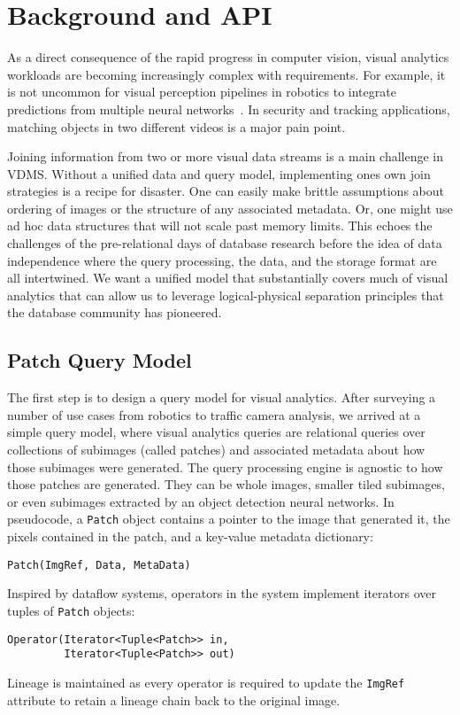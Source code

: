 \section{Background and API}
As a direct consequence of the rapid progress in computer vision, visual analytics workloads are becoming increasingly complex with requirements. 
For example, it is not uncommon for visual perception pipelines in robotics to integrate predictions from multiple neural networks~\cite{hodson2018robots}.
In security and tracking applications, matching objects in two different videos is a major pain point.

Joining information from two or more visual data streams is a main challenge in VDMS.
Without a unified data and query model, implementing ones own join strategies is a recipe for disaster.
One can easily make brittle assumptions about ordering of images or the structure of any associated metadata.
Or, one might use ad hoc data structures that will not scale past memory limits.
This echoes the challenges of the pre-relational days of database research before the idea of data independence where the query processing, the data, and the storage format are all intertwined.
We want a unified model that substantially covers much of visual analytics that can allow us to leverage logical-physical separation principles that the database community has pioneered.

\subsection{Patch Query Model}
The first step is to design a query model for visual analytics.
After surveying a number of use cases from robotics to traffic camera analysis, we arrived at a simple query model, where visual analytics queries are relational queries over collections of subimages (called patches) and associated metadata about how those subimages were generated.
The query processing engine is agnostic to how those patches are generated.
They can be whole images, smaller tiled subimages, or even subimages extracted by an object detection neural networks.
In pseudocode, a \texttt{Patch} object contains a pointer to the image that generated it, the pixels contained in the patch, and a key-value metadata dictionary:
\begin{lstlisting}
Patch(ImgRef, Data, MetaData)
\end{lstlisting}
Inspired by dataflow systems, operators in the system implement iterators over tuples of \texttt{Patch} objects:
\begin{lstlisting}
Operator(Iterator<Tuple<Patch>> in, 
         Iterator<Tuple<Patch>> out)
\end{lstlisting}
Lineage is maintained as every operator is required to update the \texttt{ImgRef} attribute to retain a lineage chain back to the original image.


